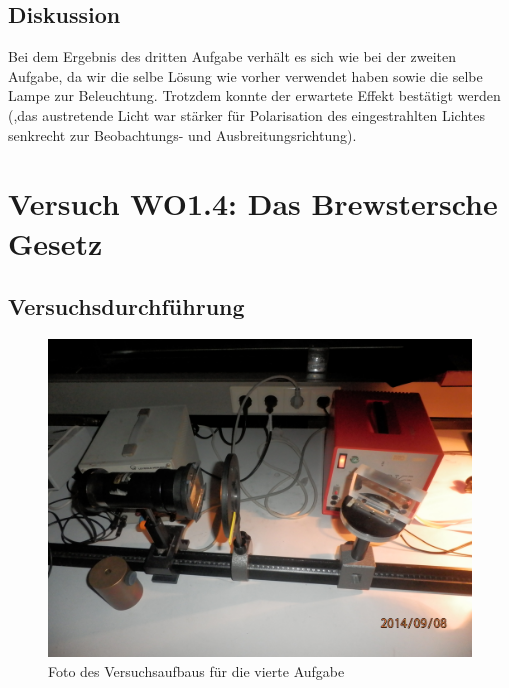 \documentclass[12pt]{scrartcl}
\begin{document}
\subsection{Diskussion}
Bei dem Ergebnis des dritten Aufgabe verhält es sich wie bei der zweiten Aufgabe, da wir die selbe Lösung wie vorher verwendet haben sowie die selbe Lampe zur Beleuchtung. Trotzdem konnte der erwartete Effekt bestätigt werden (,das austretende Licht war stärker für Polarisation des eingestrahlten Lichtes senkrecht zur Beobachtungs- und Ausbreitungsrichtung).

\section{Versuch WO1.4:
Das Brewstersche Gesetz}
\subsection{Versuchsdurchführung}

\begin{figure}[H]
\centering
    \includegraphics[scale = 0.1]{aufgabe_4.JPG}
  	\caption[Foto des Versuchsaufbaus für die vierte Aufgabe]{Foto des Versuchsaufbaus für die vierte Aufgabe}
  \label{fig:aufgabe_4}
\end{figure}
\end{document}
